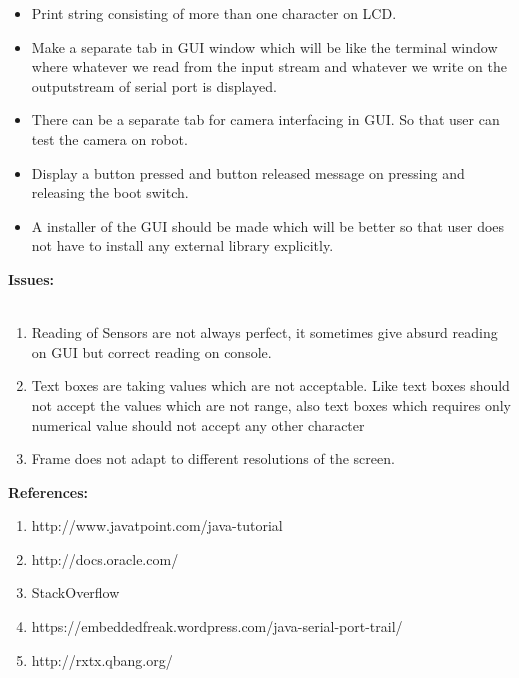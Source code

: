 \documentclass{article}
\begin{document}
	 \begin{itemize}
	 	\item Print string consisting of more than one character on LCD. 
	 	\item Make a separate tab in GUI window which will be like the terminal window where whatever we read from the input stream and whatever we write on the outputstream of serial port is displayed.
	 	\item There can be a separate tab for camera interfacing in GUI. So that user can test the camera on robot.
	 	\item Display a button pressed and button released message on pressing and releasing the boot switch.
	 	\item A installer of the GUI should be made which will be better so that user does not have to install any external library explicitly.  
	 \end{itemize} 
	\newpage
	\textbf{\huge Issues:} \\ \\
	\begin{enumerate}
		\item Reading of Sensors are not always perfect, it sometimes give absurd reading on GUI but correct reading on console.
		\item Text boxes are taking values which are not acceptable. Like text boxes should not accept the values which are not range, also text boxes which requires only numerical value should not accept any other character
		\item Frame does not adapt to different resolutions of the screen. 
	\end{enumerate}
	\newpage
	\textbf{\huge References:} \\ \vspace{1cm}
	\begin{enumerate}
		\item http://www.javatpoint.com/java-tutorial
		\item http://docs.oracle.com/
		\item StackOverflow
		\item https://embeddedfreak.wordpress.com/java-serial-port-trail/
		\item http://rxtx.qbang.org/
	\end{enumerate}
\end{document}
